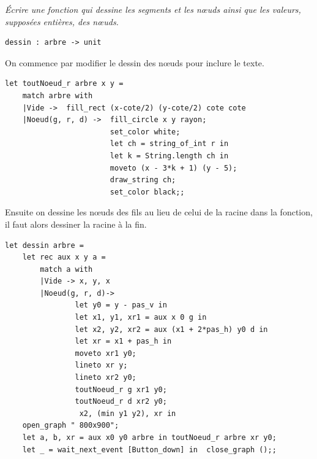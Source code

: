 \begin{Exercise}\it 
Écrire une fonction  qui dessine les segments et les nœuds ainsi que les valeurs, supposées entières, des nœuds.
\end{Exercise}
\begin{lstlisting}
dessin : arbre -> unit
\end{lstlisting}
\begin{Answer}

On commence par modifier le dessin des nœuds pour inclure le texte.
\begin{lstlisting}
let toutNoeud_r arbre x y =
    match arbre with
    |Vide ->  fill_rect (x-cote/2) (y-cote/2) cote cote
    |Noeud(g, r, d) ->  fill_circle x y rayon;
                        set_color white;
                        let ch = string_of_int r in
                        let k = String.length ch in
                        moveto (x - 3*k + 1) (y - 5);
                        draw_string ch;
                        set_color black;;
\end{lstlisting}

Ensuite on dessine les nœuds des fils au lieu de celui de la racine dans la fonction, il faut alors dessiner la racine à la fin.

\begin{lstlisting}
let dessin arbre =
    let rec aux x y a =
        match a with
        |Vide -> x, y, x
        |Noeud(g, r, d)-> 
                let y0 = y - pas_v in
                let x1, y1, xr1 = aux x 0 g in
                let x2, y2, xr2 = aux (x1 + 2*pas_h) y0 d in
                let xr = x1 + pas_h in
                moveto xr1 y0;
                lineto xr y;
                lineto xr2 y0;
                toutNoeud_r g xr1 y0;
                toutNoeud_r d xr2 y0;
                 x2, (min y1 y2), xr in
    open_graph " 800x900";
    let a, b, xr = aux x0 y0 arbre in toutNoeud_r arbre xr y0;
    let _ = wait_next_event [Button_down] in  close_graph ();;
\end{lstlisting}
\end{Answer}



